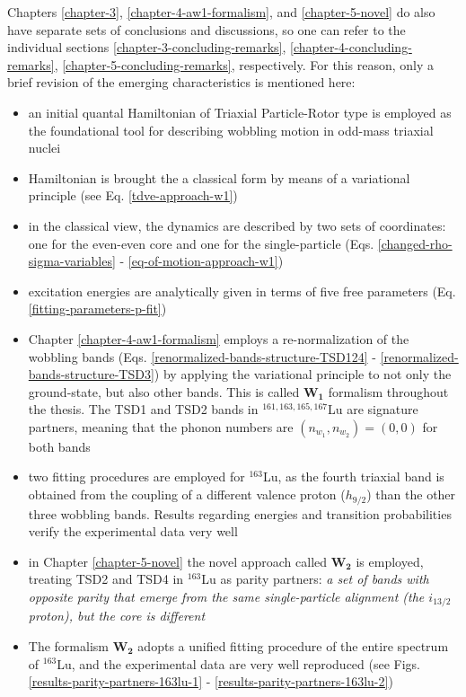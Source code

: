 Chapters \ref{chapter-3}, \ref{chapter-4-aw1-formalism}, and \ref{chapter-5-novel} do also have separate sets of conclusions and discussions, so one can refer to the individual sections \ref{chapter-3-concluding-remarks}, \ref{chapter-4-concluding-remarks}, \ref{chapter-5-concluding-remarks}, respectively. For this reason, only a brief revision of the emerging characteristics is mentioned here:
\begin{itemize}
    \item an initial quantal Hamiltonian of Triaxial Particle-Rotor type is employed as the foundational tool for describing wobbling motion in odd-mass triaxial nuclei
    \item Hamiltonian is brought the a classical form by means of a variational principle (see Eq. \eqref{tdve-approach-w1})
    \item in the classical view, the dynamics are described by two sets of coordinates: one for the even-even core and one for the single-particle (Eqs. \eqref{changed-rho-sigma-variables} - \eqref{eq-of-motion-approach-w1})
    \item excitation energies are analytically given in terms of five free parameters (Eq. \eqref{fitting-parameters-p-fit})
    \item Chapter \ref{chapter-4-aw1-formalism} employs a re-normalization of the wobbling bands (Eqs. \eqref{renormalized-bands-structure-TSD124} - \eqref{renormalized-bands-structure-TSD3}) by applying the variational principle to not only the ground-state, but also other bands. This is called $\mathbf{W_1}$ formalism throughout the thesis. The TSD1 and TSD2 bands in $^{161,163,165,167}$Lu are signature partners, meaning that the phonon numbers are $(n_{w_1},n_{w_2})=(0,0)$ for both bands
    \item two fitting procedures are employed for $^{163}$Lu, as the fourth triaxial band is obtained from the coupling of a different valence proton ($h_{9/2}$) than the other three wobbling bands. Results regarding energies and transition probabilities verify the experimental data very well
    \item in Chapter \ref{chapter-5-novel} the novel approach called $\mathbf{W_2}$ is employed, treating TSD2 and TSD4 in $^{163}$Lu as parity partners: \emph{a set of bands with opposite parity that emerge from the same single-particle alignment (the $i_{13/2}$ proton), but the core is different}
    \item The formalism $\mathbf{W_2}$ adopts a unified fitting procedure of the entire spectrum of $^{163}$Lu, and the experimental data are very well reproduced (see Figs. \ref{results-parity-partners-163lu-1} - \ref{results-parity-partners-163lu-2})

\end{itemize}
